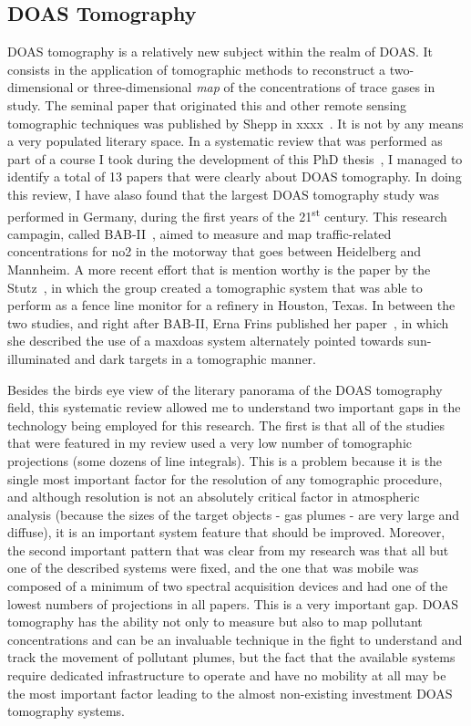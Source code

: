 \subsection{DOAS Tomography}%
\label{sub:doas_tomography}

DOAS tomography is a relatively new subject within the realm of
\gls{DOAS}. It consists in the application of tomographic methods to
reconstruct a two-dimensional or three-dimensional \emph{map} of the
concentrations of trace gases in study. The seminal paper that
originated this and other remote sensing tomographic techniques was
published by Shepp in xxxx~. It is not by any means a very populated
literary space. In a systematic review that was performed as part of a
course I took during the development of this PhD thesis~, I managed
to identify a total of 13 papers that were clearly about DOAS
tomography. In doing this review, I have alaso found that the largest
DOAS tomography study was performed in Germany, during the first years
of the 21\textsuperscript{st} century. This research campagin, called
BAB-II~\cite{Laepple2004}, aimed to measure and map traffic-related
concentrations for \gls{no2} in the motorway that goes between
Heidelberg and Mannheim. A more recent effort that is mention worthy is
the paper by the Stutz~\cite{Stutz2016}, in which the group created a
tomographic system that was able to perform as a fence  line monitor for
a refinery in Houston, Texas. In between the two studies, and right
after BAB-II, Erna Frins published her paper~\cite{Frins2006}, in which
she described the use of a \gls{maxdoas} system alternately pointed
towards sun-illuminated and dark targets in a tomographic manner.

Besides the birds eye view of the literary panorama of the DOAS
tomography field, this systematic review allowed me to understand two
important gaps in the technology being employed for this research. The
first is that all of the studies that were featured in my review used a
very low number of tomographic projections (some dozens of line
integrals). This is a problem because it is the single most important
factor for the resolution of any tomographic procedure, and although
resolution is not an absolutely critical factor in atmospheric analysis
(because the sizes of the target objects - gas plumes - are very large
and diffuse), it is an important system feature that should be improved.
Moreover, the second important pattern that was clear from my research
was that all but one of the described systems were fixed, and the one
that was mobile was composed of a minimum of two spectral acquisition
devices and had one of the lowest numbers of projections in all papers.
This is a very important gap. DOAS tomography has the ability not only
to measure but also to map pollutant concentrations and can be an
invaluable technique in the fight to understand and track the movement
of pollutant plumes, but the fact that the available systems require
dedicated infrastructure to operate and have no mobility at all may be
the most important factor leading to the almost non-existing investment
DOAS tomography systems.

